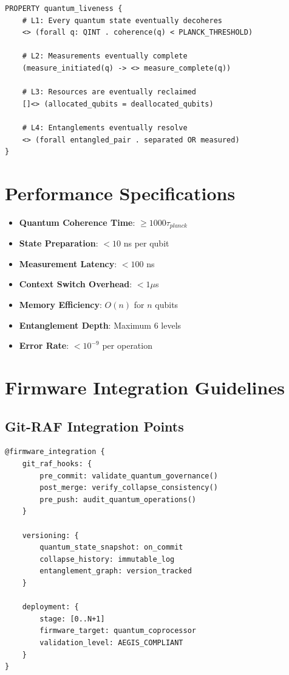 \documentclass[12pt,a4paper]{article}
\begin{document}
\begin{lstlisting}[style=riftlang,caption={Quantum Liveness Guarantees}]
PROPERTY quantum_liveness {
    # L1: Every quantum state eventually decoheres
    <> (forall q: QINT . coherence(q) < PLANCK_THRESHOLD)
    
    # L2: Measurements eventually complete
    (measure_initiated(q) -> <> measure_complete(q))
    
    # L3: Resources are eventually reclaimed
    []<> (allocated_qubits = deallocated_qubits)
    
    # L4: Entanglements eventually resolve
    <> (forall entangled_pair . separated OR measured)
}
\end{lstlisting}

\section{Performance Specifications}

\begin{tcolorbox}[colback=green!5!white,colframe=classicalgreen,title=Performance Requirements]
\begin{itemize}
    \item \textbf{Quantum Coherence Time}: $\geq 1000 \tau_{planck}$
    \item \textbf{State Preparation}: $< 10$ ns per qubit
    \item \textbf{Measurement Latency}: $< 100$ ns
    \item \textbf{Context Switch Overhead}: $< 1 \mu$s
    \item \textbf{Memory Efficiency}: $O(n)$ for $n$ qubits
    \item \textbf{Entanglement Depth}: Maximum 6 levels
    \item \textbf{Error Rate}: $< 10^{-9}$ per operation
\end{itemize}
\end{tcolorbox}

\section{Firmware Integration Guidelines}

\subsection{Git-RAF Integration Points}

\begin{lstlisting}[style=riftlang,caption={Git-RAF Firmware Hooks}]
@firmware_integration {
    git_raf_hooks: {
        pre_commit: validate_quantum_governance()
        post_merge: verify_collapse_consistency()
        pre_push: audit_quantum_operations()
    }
    
    versioning: {
        quantum_state_snapshot: on_commit
        collapse_history: immutable_log
        entanglement_graph: version_tracked
    }
    
    deployment: {
        stage: [0..N+1]
        firmware_target: quantum_coprocessor
        validation_level: AEGIS_COMPLIANT
    }
}
\end{lstlisting}
\end{document}
